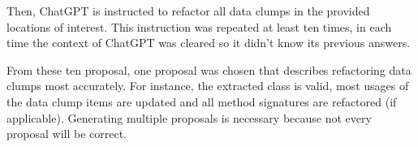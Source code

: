 Then, ChatGPT is instructed to refactor all data clumps in the provided locations of interest. This instruction was repeated at least ten times, in each time the context of ChatGPT was cleared so it didn't know its previous answers. 

From these ten proposal, one proposal was chosen that describes refactoring data clumps most accurately. For instance, the extracted class is valid, most usages of the data clump items are updated and all method signatures are refactored (if applicable). Generating multiple proposals is necessary because not every proposal will be correct.
\begin{comment}
For each selected project, one data clump was chosen. Two selection approaches were used. 
In the first approach, a data clump was chosen based on a weighted combination of metrics to identify an \enquote{important} data clump. These metrics are:

\begin{itemize}
    \item The number of occurrences of data clump. For instance, if there is a data clump with the variables \textit{x}, \textit{y}, and  \textit{z}, it is counted how many methods have these parameters and how many classes have these fields

     \item The number of data clump items. For instance, the \enquote{xyz}-data-clump has three data clump items.
     
    \item The number of affected files. Every file that is affected by a data clump. This includes the location of the data clump and also the files where methods and fields that are part of the data clump are references because these files must also be changed if the data clump is refactored. 
    
\end{itemize}

From these scores, for each data clump a weighted sum was calculated. For the first two metrics, either the weight is 100 or 1. In these metrics, data clumps that occur more often or are larger are scored better so that they are more likely to be refactored because the code size can be reduced more strongly.  For the last metric, the weights were -100 or 0. A zero or negative weight was chosen because a large number of affected files can be obstacle for  refactoring as many areas of the codebase may need to be changed. If an \ac{LLM} performs the refactoring, all those files must be transmitted to the model which increases costs and resource usage. Even if \ac{LLM} is involved only marginally, it is more likely that the less files are changed the more contributors on GitHub are willing to give feedback.


\end{comment}
